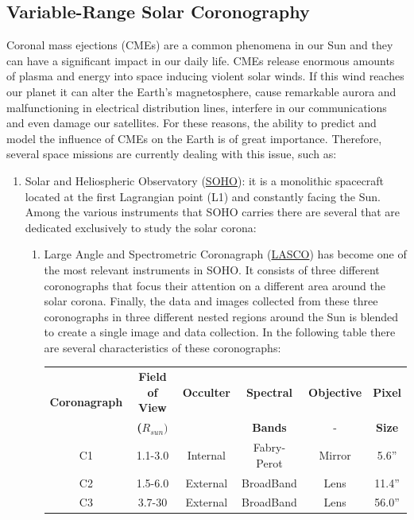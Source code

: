 \subsection{Variable-Range Solar Coronography}
\label{coronograph}
Coronal mass ejections (CMEs) are a common phenomena in our Sun and
they can have a significant impact in our daily life. CMEs release
enormous amounts of plasma and energy into space inducing violent
solar winds. If this wind reaches our planet it can alter the Earth's
magnetosphere, cause remarkable aurora and malfunctioning in electrical
distribution lines, interfere in our communications and even damage
our satellites. For these reasons, the ability to predict and model
the influence of CMEs on the Earth is of great importance. Therefore,
several space missions are currently dealing with this issue, such
as:
\begin{enumerate}
\item Solar and Heliospheric Observatory (\href{http://www.nasa.gov/mission_pages/soho/index.html\#.UjUrV8YagWA}{SOHO}):
it is a monolithic spacecraft located at the first Lagrangian point
(L1) and constantly facing the Sun. Among the various instruments
that SOHO carries there are several that are dedicated exclusively
to study the solar corona:

\begin{enumerate}
\item Large Angle and Spectrometric Coronagraph (\href{http://lasco-www.nrl.navy.mil/}{LASCO})
has become one of the most relevant instruments in SOHO. It consists
of three different coronographs that focus their attention on a different
area around the solar corona. Finally, the data and images collected
from these three coronographs in three different nested regions around
the Sun is blended to create a single image and data collection. In
the following table there are several characteristics of these coronographs:


\begin{table}[H]
\begin{centering}
\begin{tabular}{|c|c|c|c|c|c|}
\hline 
\multirow{2}{*}{\textbf{Coronagraph}} & \textbf{Field of View} & \textbf{Occulter} & \textbf{Spectral} & \textbf{Objective} & \textbf{Pixel }\tabularnewline
 & \textbf{($R_{sun})$} &  & \textbf{ Bands} & - & \textbf{Size}\tabularnewline
\hline 
\hline 
C1 & 1.1-3.0 & Internal & Fabry-Perot & Mirror & 5.6''\tabularnewline
\hline 
C2 & 1.5-6.0 & External & BroadBand & Lens & 11.4''\tabularnewline
\hline 
C3 & 3.7-30 & External & BroadBand & Lens & 56.0''\tabularnewline
\hline 
\end{tabular}
\par\end{centering}


\end{table}
\end{enumerate}
\end{enumerate}

